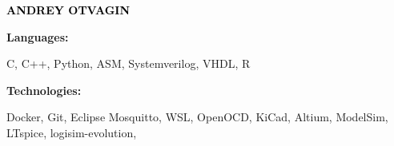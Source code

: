 \documentclass[9pt]{developercv} %
\begin{document}

\begin{minipage}[t]{0.5\textwidth} 
	\vspace{-\baselineskip} %
	
	{ \fontsize{16}{20} \textcolor{black}{\textbf{\MakeUppercase{Andrey Otvagin}}}} %
	
	\vspace{6pt}
    \hspace{12pt}

    \hspace{12pt}
    
    \hspace{12pt}

    
\end{minipage}
\hfill
\begin{minipage}[t]{0.5\textwidth}
    \vspace{-18pt}
    \vspace{-6pt}
    
    \begin{minipage}[t]{0.2\textwidth}
        \textbf{Languages:}
    \end{minipage}
    \hfill
    \begin{minipage}[t]{0.73\textwidth}
        C, C++, Python, ASM, Systemverilog, VHDL, R
    \end{minipage}
    \vspace{4mm}
    
    \begin{minipage}[t]{0.2\textwidth}
        \textbf{Technologies:}
    \end{minipage}
    \hfill
    \begin{minipage}[t]{0.73\textwidth}
        Docker, Git, Eclipse Mosquitto, WSL, OpenOCD, KiCad, Altium, ModelSim, LTspice, logisim-evolution, 
    \end{minipage}
    
\end{minipage}
\end{document}
